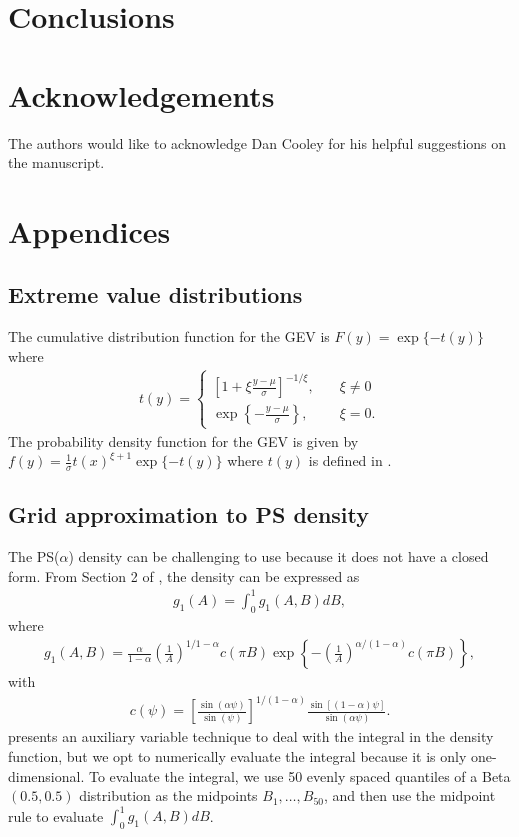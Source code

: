 \documentclass[11pt]{article}
\begin{document}
\section{Conclusions}\label{ebs:con}

\section*{Acknowledgements}
The authors would like to acknowledge Dan Cooley for his helpful suggestions on the manuscript.

\appendix
\section{Appendices}
\subsection{Extreme value distributions} \label{eba:GEV}
The cumulative distribution function for the GEV is $F(y) = \exp\{-t(y)\}$ where
\begin{align} \label{ebeq:gevt}
  t(y) = \left\{ \begin{array}{ll}
      \left[1 + \xi \displaystyle \frac{y - \mu}{\sigma}\right]^{-1 / \xi}, \quad &\xi \neq 0 \\ [0.5em]
      \exp\left\{- \displaystyle \frac{y - \mu}{\sigma}\right\}, &\xi = 0.
  \end{array}\right.
\end{align}
The probability density function for the GEV is given by $f(y) = \frac{1}{\sigma} t(x)^{\xi + 1} \exp\{-t(y)\}$ where $t(y)$ is defined in .

\subsection{Grid approximation to PS density} \label{eba:gridapprox}
The PS($\alpha$) density can be challenging to use because it does not have a closed form.
From Section 2 of \citep{Stephenson2009}, the density can be expressed as
\begin{align}
  g_1(A) = \int_0^1 g_1(A, B) dB,
\end{align}
where
\begin{align}
  g_1(A, B) = \frac{\alpha}{1 - \alpha} \left( \frac{1}{A} \right)^{1 / 1 - \alpha} c(\pi B) \exp \left\{ -\left(\frac{1}{A}\right)^{\alpha / (1 - \alpha)} c(\pi B) \right\},
\end{align}
with
\begin{align}
  c(\psi) = \left[\frac{\sin(\alpha \psi)}{\sin(\psi)}\right]^{1 / (1 - \alpha)} \frac{\sin[(1 - \alpha) \psi]}{\sin(\alpha \psi)}.
\end{align}
 presents an auxiliary variable technique to deal with the integral in the density function, but we opt to numerically evaluate the integral because it is only one-dimensional.
To evaluate the integral, we use 50 evenly spaced quantiles of a Beta$(0.5, 0.5)$ distribution as the midpoints $B_1, \ldots, B_{50}$, and then use the midpoint rule to evaluate $\displaystyle \int_0^1 g_1(A, B) dB$.
\end{document}
